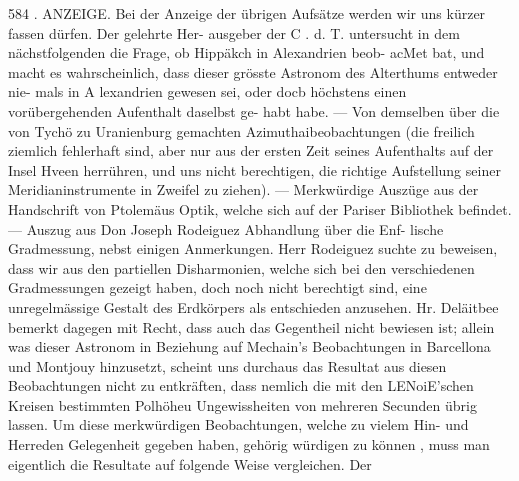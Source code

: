 \documentclass[12pt,a4paper]{article}
\begin{document}
\newpage
584 . ANZEIGE.\newline
Bei der Anzeige der übrigen Aufsätze werden wir uns kürzer fassen dürfen. Der gelehrte Her-\newline
ausgeber der C . d. T. untersucht in dem nächstfolgenden die Frage, ob Hippäkch in Alexandrien beob-\newline
acMet bat, und macht es wahrscheinlich, dass dieser grösste Astronom des Alterthums entweder nie-\newline
mals in A lexandrien gewesen sei, oder docb höchstens einen vorübergehenden Aufenthalt daselbst ge-\newline
habt habe. --- Von demselben über die von Tychö zu Uranienburg gemachten Azimuthaibeobachtungen\newline
(die freilich ziemlich fehlerhaft sind, aber nur aus der ersten Zeit seines Aufenthalts auf der Insel\newline
Hveen herrühren, und uns nicht berechtigen, die richtige Aufstellung seiner Meridianinstrumente in\newline
Zweifel zu ziehen). --- Merkwürdige Auszüge aus der Handschrift von Ptolemäus Optik, welche sich\newline
auf der Pariser Bibliothek befindet. --- Auszug aus Don Joseph Rodeiguez Abhandlung über die Enf-\newline
lische Gradmessung, nebst einigen Anmerkungen. Herr Rodeiguez suchte zu beweisen, dass wir aus\newline
den partiellen Disharmonien, welche sich bei den verschiedenen Gradmessungen gezeigt haben, doch\newline
noch nicht berechtigt sind, eine unregelmässige Gestalt des Erdkörpers als entschieden anzusehen. Hr.\newline
Deläitbee bemerkt dagegen mit Recht, dass auch das Gegentheil nicht bewiesen ist; allein was dieser\newline
Astronom in Beziehung auf Mechain's Beobachtungen in Barcellona und Montjouy hinzusetzt, scheint\newline
uns durchaus das Resultat aus diesen Beobachtungen nicht zu entkräften, dass nemlich die mit den\newline
LENoiE'schen Kreisen bestimmten Polhöheu Ungewissheiten von mehreren Secunden übrig lassen. Um\newline
diese merkwürdigen Beobachtungen, welche zu vielem Hin- und Herreden Gelegenheit gegeben haben,\newline
gehörig würdigen zu können , muss man eigentlich die Resultate auf folgende Weise vergleichen. Der\newline
\end{document}
